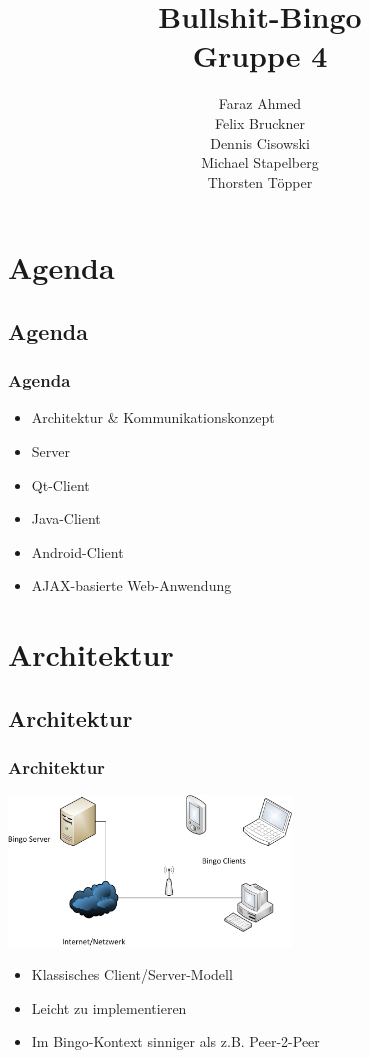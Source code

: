 \documentclass{beamer}
\title[]{Bullshit-Bingo\\ Gruppe 4}
\author{Faraz Ahmed\\
Felix Bruckner\\
Dennis Cisowski\\
Michael Stapelberg\\
Thorsten Töpper
}
\institute{Fakultät für Informatik\\
           Hochschule Mannheim}
\date{\datum}
\begin{document}
\begin{frame}
\titlepage
\end{frame}



\section{Agenda}

\subsection{Agenda}

\begin{frame}[fragile]
\frametitle{Agenda}
\begin{itemize}
\item Architektur \& Kommunikationskonzept
\item Server
\item Qt-Client
\item Java-Client
\item Android-Client
\item AJAX-basierte Web-Anwendung
\end{itemize}
\end{frame}

\section{Architektur}

\subsection{Architektur}
\begin{frame}[fragile]
\frametitle{Architektur}
\begin{center}
\includegraphics[height=4cm]{bingoclientserver.png}
\end{center}
\begin{itemize}
\item Klassisches Client/Server-Modell
\item Leicht zu implementieren
\item Im Bingo-Kontext sinniger als z.B. Peer-2-Peer
\end{itemize}
\end{frame}
\end{document}
